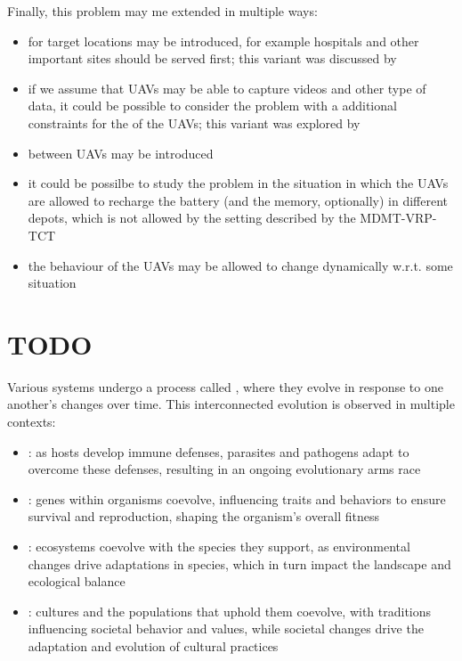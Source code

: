 \documentclass[a4paper, 12pt]{report}
\begin{document}
    Finally, this problem may me extended in multiple ways:

    \begin{itemize}
        \item {} for target locations may be introduced, for example hospitals and other important sites should be served first; this variant was discussed by \textcite{calamoneri2}
        \item if we assume that UAVs may be able to capture videos and other type of data, it could be possible to consider the problem with a additional constraints for the  of the UAVs; this variant was explored by \textcite{sorbelli}
        \item {} between UAVs may be introduced
        \item it could be possilbe to study the problem in the situation in which the UAVs are allowed to recharge the battery (and the memory, optionally) in different depots, which is not allowed by the setting described by the MDMT-VRP-TCT
        \item the behaviour of the UAVs may be allowed to change dynamically w.r.t. some  situation
    \end{itemize}

    \chapter{TODO}

    Various systems undergo a process called , where they evolve in response to one another's changes over time. This interconnected evolution is observed in multiple contexts:

    \begin{itemize}
        \item {}: as hosts develop immune defenses, parasites and pathogens adapt to overcome these defenses, resulting in an ongoing evolutionary arms race
        \item {}: genes within organisms coevolve, influencing traits and behaviors to ensure survival and reproduction, shaping the organism's overall fitness
        \item {}: ecosystems coevolve with the species they support, as environmental changes drive adaptations in species, which in turn impact the landscape and ecological balance
        \item {}: cultures and the populations that uphold them coevolve, with traditions influencing societal behavior and values, while societal changes drive the adaptation and evolution of cultural practices
    \end{itemize}
\end{document}
